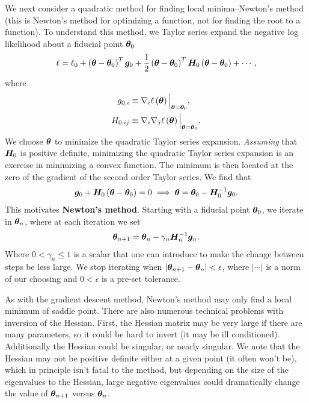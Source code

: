 We next consider a quadratic method for finding local minima--Newton's method (this is Newton's method for optimizing a function, not for finding the root to a function).
To understand this method, we Taylor series expand the negative log likelihood about a fiducial point ${\bm \theta}_0$
\begin{align}
    \label{eq:quadratic-taylor-vector}
    \ell 
    =
    \ell_0
    +
    \left({\bm \theta}-{\bm \theta}_0\right)^T{\bm g}_0
    +
    \frac{1}{2}\left({\bm \theta}-{\bm \theta}_0\right)^T {\bm H}_0 \left({\bm \theta}-{\bm \theta}_0\right) 
    +
    \cdots
    ,
\end{align}
where
\begin{align}
    g_{0,i}
    &\equiv
    \nabla_i\ell\left({\bm \theta}\right)\Big|_{{\bm \theta}={\bm \theta}_0}
    ,\\
    H_{0,ij}
    &\equiv
    \nabla_i\nabla_j\ell\left({\bm \theta}\right)
    \Big|_{{\bm \theta}={\bm \theta}_0}
    .
\end{align}
We choose ${\bm \theta}$ to minimize the quadratic Taylor series expansion.
\emph{Assuming} that ${\bm H}_0$ is positive definite, minimizing the quadratic Taylor series expansion is an exercise in minimizing a convex function.
The minimum is then located at the zero of the gradient of the second order Taylor series.
We find that
\begin{align}
    {\bm g}_0 + {\bm H}_0 \left({\bm \theta} - {\bm \theta}_0\right) = 0
    \implies
    {\bm \theta} = {\bm \theta}_0 - {\bm H}_0^{-1} {\bm g}_0
    .
\end{align}
This motivates \textbf{Newton's method}.
Starting with a fiducial point ${\bm \theta}_0$, we iterate in ${\bm \theta}_n$, where at each iteration we set 
\begin{align}
    {\bm \theta}_{n+1} = {\bm \theta}_n - \gamma_n {\bm H}_n^{-1} {\bm g}_n
    .
\end{align}
Where $0<\gamma_n\leq1$
is a scalar that one can introduce to make the change between steps be less large.
We stop iterating when $\left|{\bm \theta}_{n+1}-{\bm \theta}_n\right|<\epsilon$, where $\left|\cdots\right|$ is a norm of our choosing and $0<\epsilon$ is a pre-set tolerance.

As with the gradient descent method, Newton's method may only find a local minimum of saddle point. 
There are also numerous technical problems with inversion of the Hessian.
First, the Hessian matrix may be very large if there are many parameters, so it could be hard to invert (it may be ill conditioned). 
Additionally the Hessian could be singular, or nearly singular.
We note that the Hessian may not be positive definite either at a given point (it often won't be), which in principle isn't fatal to the method, but depending on the size of the eigenvalues to the Hessian, large negative eigenvalues could dramatically change the value of ${\bm \theta}_{n+1}$ versus ${\bm \theta}_n$.
